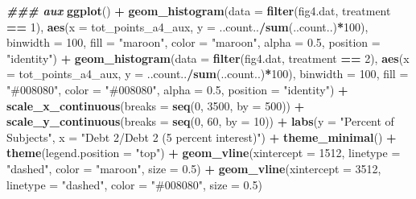 \documentclass[
]{article}
\newenvironment{Shaded}{\begin{snugshade}}{\end{snugshade}}
\newcommand{\AttributeTok}[1]{\textcolor[rgb]{0.13,0.29,0.53}{#1}}
\newcommand{\DecValTok}[1]{\textcolor[rgb]{0.00,0.00,0.81}{#1}}
\newcommand{\DocumentationTok}[1]{\textcolor[rgb]{0.56,0.35,0.01}{\textbf{\textit{#1}}}}
\newcommand{\FloatTok}[1]{\textcolor[rgb]{0.00,0.00,0.81}{#1}}
\newcommand{\FunctionTok}[1]{\textcolor[rgb]{0.13,0.29,0.53}{\textbf{#1}}}
\newcommand{\NormalTok}[1]{#1}
\newcommand{\SpecialCharTok}[1]{\textcolor[rgb]{0.81,0.36,0.00}{\textbf{#1}}}
\newcommand{\StringTok}[1]{\textcolor[rgb]{0.31,0.60,0.02}{#1}}
\begin{document}
\begin{Shaded}
\begin{Highlighting}[]
\DocumentationTok{\#\#\# aux}
\FunctionTok{ggplot}\NormalTok{() }\SpecialCharTok{+}
  \FunctionTok{geom\_histogram}\NormalTok{(}\AttributeTok{data =} \FunctionTok{filter}\NormalTok{(fig4.dat, treatment }\SpecialCharTok{==} \DecValTok{1}\NormalTok{),}
                 \FunctionTok{aes}\NormalTok{(}\AttributeTok{x =}\NormalTok{ tot\_points\_a4\_aux, }\AttributeTok{y =}\NormalTok{ ..count..}\SpecialCharTok{/}\FunctionTok{sum}\NormalTok{(..count..)}\SpecialCharTok{*}\DecValTok{100}\NormalTok{),}
                 \AttributeTok{binwidth =} \DecValTok{100}\NormalTok{, }\AttributeTok{fill =} \StringTok{"maroon"}\NormalTok{, }\AttributeTok{color =} \StringTok{"maroon"}\NormalTok{, }\AttributeTok{alpha =} \FloatTok{0.5}\NormalTok{, }\AttributeTok{position =} \StringTok{"identity"}\NormalTok{) }\SpecialCharTok{+}
  \FunctionTok{geom\_histogram}\NormalTok{(}\AttributeTok{data =} \FunctionTok{filter}\NormalTok{(fig4.dat, treatment }\SpecialCharTok{==} \DecValTok{2}\NormalTok{),}
                 \FunctionTok{aes}\NormalTok{(}\AttributeTok{x =}\NormalTok{ tot\_points\_a4\_aux, }\AttributeTok{y =}\NormalTok{ ..count..}\SpecialCharTok{/}\FunctionTok{sum}\NormalTok{(..count..)}\SpecialCharTok{*}\DecValTok{100}\NormalTok{),}
                 \AttributeTok{binwidth =} \DecValTok{100}\NormalTok{, }\AttributeTok{fill =} \StringTok{"\#008080"}\NormalTok{, }\AttributeTok{color =} \StringTok{"\#008080"}\NormalTok{, }\AttributeTok{alpha =} \FloatTok{0.5}\NormalTok{, }\AttributeTok{position =} \StringTok{"identity"}\NormalTok{) }\SpecialCharTok{+}
  \FunctionTok{scale\_x\_continuous}\NormalTok{(}\AttributeTok{breaks =} \FunctionTok{seq}\NormalTok{(}\DecValTok{0}\NormalTok{, }\DecValTok{3500}\NormalTok{, }\AttributeTok{by =} \DecValTok{500}\NormalTok{)) }\SpecialCharTok{+}
  \FunctionTok{scale\_y\_continuous}\NormalTok{(}\AttributeTok{breaks =} \FunctionTok{seq}\NormalTok{(}\DecValTok{0}\NormalTok{, }\DecValTok{60}\NormalTok{, }\AttributeTok{by =} \DecValTok{10}\NormalTok{)) }\SpecialCharTok{+}
  \FunctionTok{labs}\NormalTok{(}\AttributeTok{y =} \StringTok{"Percent of Subjects"}\NormalTok{, }\AttributeTok{x =} \StringTok{"Debt 2/Debt 2 (5 percent interest)"}\NormalTok{) }\SpecialCharTok{+}
  \FunctionTok{theme\_minimal}\NormalTok{() }\SpecialCharTok{+}
  \FunctionTok{theme}\NormalTok{(}\AttributeTok{legend.position =} \StringTok{"top"}\NormalTok{) }\SpecialCharTok{+}
  \FunctionTok{geom\_vline}\NormalTok{(}\AttributeTok{xintercept =} \DecValTok{1512}\NormalTok{, }\AttributeTok{linetype =} \StringTok{"dashed"}\NormalTok{, }\AttributeTok{color =} \StringTok{"maroon"}\NormalTok{, }\AttributeTok{size =} \FloatTok{0.5}\NormalTok{) }\SpecialCharTok{+}
  \FunctionTok{geom\_vline}\NormalTok{(}\AttributeTok{xintercept =} \DecValTok{3512}\NormalTok{, }\AttributeTok{linetype =} \StringTok{"dashed"}\NormalTok{, }\AttributeTok{color =} \StringTok{"\#008080"}\NormalTok{, }\AttributeTok{size =} \FloatTok{0.5}\NormalTok{)}
\end{Highlighting}
\end{Shaded}
\end{document}
